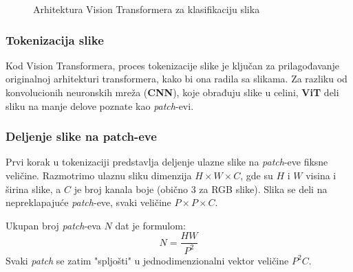 \documentclass[12pt]{article}
\begin{document}
   \begin{figure}[h!]
      \centering
      \vspace{1cm} %
      \caption{Arhitektura Vision Transformera za klasifikaciju slika}
      \label{fig:vit_architecture}
   \end{figure}
   \newpage

   \subsubsection{Tokenizacija slike}
   Kod Vision Transformera, proces tokenizacije slike je ključan za prilagođavanje originalnoj arhitekturi 
   transformera, kako bi ona radila sa slikama. Za razliku od konvolucionih neuronskih mreža 
   (\textbf{CNN}), koje obrađuju slike u celini, \textbf{ViT} deli sliku na manje 
   delove poznate kao \textit{patch}-evi.
   
   \subsubsection*{Deljenje slike na patch-eve}
   Prvi korak u tokenizaciji predstavlja deljenje ulazne slike na \textit{patch}-eve fiksne veličine. 
   Razmotrimo ulaznu sliku dimenzija \( H \times W \times C \), 
   gde su \( H \) i \( W \) visina i širina slike, a \( C \) je broj 
   kanala boje (obično 3 za RGB slike). Slika se deli na nepreklapajuće \textit{patch}-eve, 
   svaki veličine \( P \times P \times C \).
   
   Ukupan broj \textit{patch}-eva \( N \) dat je formulom:
   \[
   N = \frac{HW}{P^2}
   \]
   Svaki \textit{patch} se zatim "spljošti" u jednodimenzionalni vektor 
   veličine \( P^2C \).
   
\end{document}
